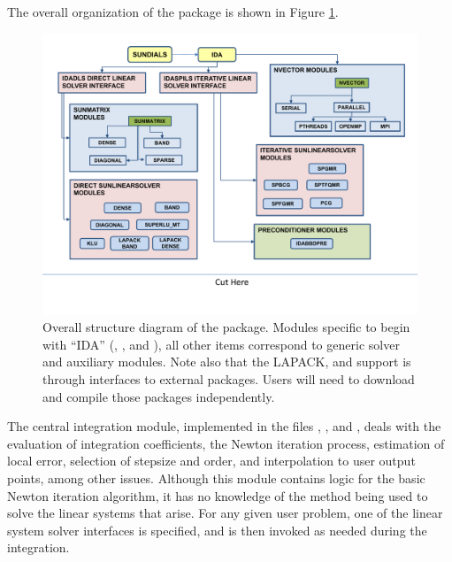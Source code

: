 The overall organization of the {\ida} package is shown in Figure
\ref{f:idaorg}.
\begin{figure}
{\centerline{\includegraphics[width=\textwidth]{idaorg}}}
\caption [Overall structure diagram of the {\ida} package]
{Overall structure diagram of the {\ida} package.
  Modules specific to {\ida} begin with ``IDA'' ({\idadls},
  {\idaspils}, and {\idabbdpre}), all other items correspond
  to generic solver and auxiliary modules. 
  Note also that the LAPACK, {\klu} and {\superlumt} support is
  through interfaces to external packages. 
  Users will need to download and compile those packages independently.}
\label{f:idaorg}
\end{figure}
The central integration module, implemented in the files ,
, and , deals with the evaluation of integration 
coefficients, the Newton iteration process, estimation of local error,
selection of stepsize and order, and interpolation to user output
points, among other issues.  Although this module contains logic for
the basic Newton iteration algorithm, it has no knowledge of the
method being used to solve the linear systems that arise.  For any
given user problem, one of the linear system solver interfaces is specified, and
is then invoked as needed during the integration. 

